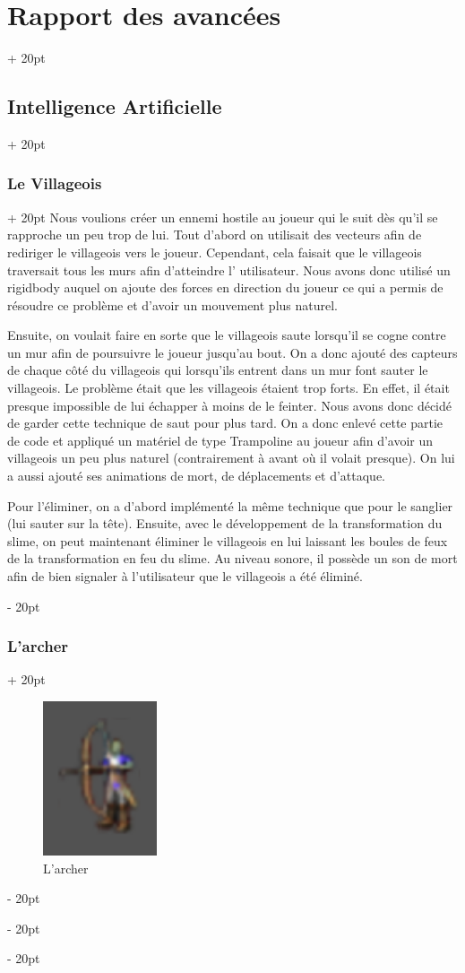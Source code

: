 \documentclass[a4paper, 12pt, twoside]{article}
\newcommand{\ind}[1][20pt]{\advance\leftskip + #1}
\newcommand{\deind}[1][20pt]{\advance\leftskip - #1}
\newenvironment{indt}[2][20pt]{#2 \par \ind[#1]}{\par \deind} %
\begin{document}
\begin{indt}{\section{Rapport des avancées}}
\begin{indt}{\subsection{Intelligence Artificielle}}
\begin{indt}{\subsubsection{Le Villageois}}
                Nous voulions créer un ennemi hostile au joueur qui le suit dès qu’il se rapproche un peu trop de lui. Tout d’abord on utilisait des vecteurs afin de rediriger le villageois vers le joueur. Cependant, cela faisait que le villageois traversait tous les murs afin d’atteindre l' utilisateur. Nous avons donc utilisé un rigidbody auquel on ajoute des forces en direction du joueur ce qui a permis de résoudre ce problème et d’avoir un mouvement plus naturel.

                Ensuite, on voulait faire en sorte que le villageois saute lorsqu'il se cogne contre un mur afin de poursuivre le joueur jusqu’au bout. On a donc ajouté des capteurs de chaque côté du villageois qui lorsqu’ils entrent dans un mur font sauter le villageois. Le problème était que les villageois étaient trop forts. En effet, il était presque impossible de lui échapper à moins de le feinter. Nous avons donc décidé de garder cette technique de saut pour plus tard. On a donc enlevé cette partie de code et appliqué un matériel de type Trampoline au joueur afin d’avoir un villageois un peu plus naturel (contrairement à avant où il volait presque). On lui a aussi ajouté ses animations de mort, de déplacements et d’attaque.

                Pour l’éliminer, on a d’abord implémenté la même technique que pour le sanglier (lui sauter sur la tête). Ensuite, avec le développement de la transformation du slime, on peut maintenant éliminer le villageois en lui laissant les boules de feux de la transformation en feu du slime.
                Au niveau sonore, il possède un son de mort afin de bien signaler à l’utilisateur que le villageois a été éliminé.
            \end{indt}

            \begin{indt}{\subsubsection{L’archer}}
                \begin{figure}[h]
                    \centering
                    \includegraphics[width=0.3\textwidth]{archer.png}
                    \caption{L'archer}
                    \label{fig:mesh1}
                \end{figure}


\end{indt}
\end{indt}
\end{indt}
\end{document}
